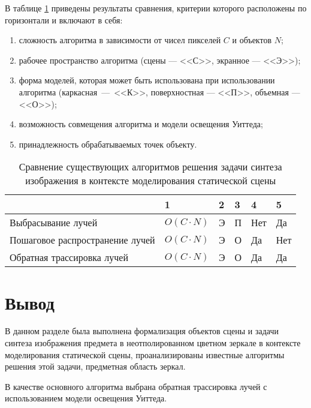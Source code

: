В таблице \ref{tab:compare} приведены результаты сравнения, критерии которого расположены по горизонтали и включают в себя:
\begin{enumerate}
	\item сложность алгоритма в зависимости от чисел пикселей $C$ и объектов $N$;
	\item рабочее пространство алгоритма (сцены --- <<С>>, экранное --- <<Э>>);
	\item форма моделей, которая может быть использована при использовании алгоритма (каркасная~---~<<К>>, поверхностная --- <<П>>, объемная --- <<О>>);
	\item возможность совмещения алгоритма и модели освещения Уиттеда;
	\item принадлежность обрабатываемых точек объекту.
\end{enumerate}

\begin{table}[hbtp]
	\begin{center}
		\begin{flushleft}
			\caption{\label{tab:compare}Сравнение существующих алгоритмов решения задачи синтеза изображения в контексте моделирования статической сцены}
		\end{flushleft}
		\begin{tabular}{|l | l | l | l | l | l |} 
			\hline 
			~					& {1} & {2} & {3} & {4} & {5} \\ \hline
			Выбрасывание лучей & \texttt{$O(C \cdot N)$} & Э & П  & Нет & Да \\ \hline
			Пошаговое распространение лучей & \texttt{$O(C \cdot N)$} & Э & О & Да & Нет \\ \hline
			Обратная трассировка лучей & \texttt{$O(C \cdot N)$} & Э & О & Да & Да \\ \hline
		\end{tabular}
	\end{center}
\end{table}

\section*{Вывод}

В данном разделе была выполнена формализация объектов сцены и задачи синтеза изображения предмета в неотполированном цветном зеркале в контексте моделирования статической сцены, проанализированы известные алгоритмы решения этой задачи, предметная область зеркал.

В качестве основного алгоритма выбрана обратная трассировка лучей с использованием модели освещения Уиттеда.